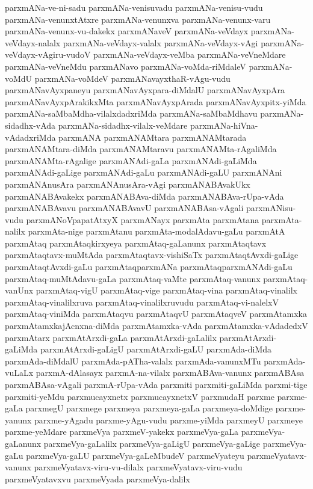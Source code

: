 {parxmANa-ve-ni-sadu
parxmANa-venisuvadu
parxmANa-venisu-vudu
parxmANa-venunxtAtxre
parxmANa-venunxva
parxmANa-venunx-varu
parxmANa-venunx-vu-dakekx
parxmANaveV
parxmANa-veVdayx
parxmANa-veVdayx-nalalx
parxmANa-veVdayx-valalx
parxmANa-veVdayx-vAgi
parxmANa-veVdayx-vAgiru-vudoV
parxmANa-veVdayx-veMba
parxmANa-veVneMdare
parxmANa-veVneMdu
parxmANavo
parxmANa-voMda-riMdaleV
parxmANa-voMdU
parxmANa-voMdeV
parxmANavayxthaR-vAgu-vudu
parxmANavAyxpaneyu
parxmANavAyxpara-diMdalU
parxmANavAyxpAra
parxmANavAyxpArakikxMta
parxmANavAyxpArada
parxmANavAyxpitx-yiMda
parxmANa-saMbaMdha-vilalxdadxriMda
parxmANa-saMbaMdhavu
parxmANa-sidadhx-vAda
parxmANa-sidadhx-vilalx-veMdare
parxmANa-hiVna-vAdadxriMda
parxmANA
parxmANAMtara
parxmANAMtarada
parxmANAMtara-diMda
parxmANAMtaravu
parxmANAMta-rAgaliMda
parxmANAMta-rAgalige
parxmANAdi-gaLa
parxmANAdi-gaLiMda
parxmANAdi-gaLige
parxmANAdi-gaLu
parxmANAdi-gaLU
parxmANAni
parxmANAnusAra
parxmANAnusAra-vAgi
parxmANABAvakUkx
parxmANABAvakekx
parxmANABAva-diMda
parxmANABAva-rUpa-vAda
parxmANABAvavu
parxmANABAvavU
parxmANABAsa-vAgali
parxmANisu-vudu
parxmANoVpapatAtxyX
parxmANayx
parxmAta
parxmAtana
parxmAta-nalilx
parxmAta-nige
parxmAtanu
parxmAta-modalAdavu-gaLu
parxmAtA
parxmAtaq
parxmAtaqkirxyeya
parxmAtaq-gaLanunx
parxmAtaqtavx
parxmAtaqtavx-muMtAda
parxmAtaqtavx-vishiSaTx
parxmAtaqtAvxdi-gaLige
parxmAtaqtAvxdi-gaLu
parxmAtaqparxmANa
parxmAtaqparxmANAdi-gaLu
parxmAtaq-muMtAdavu-gaLa
parxmAtaq-vaMte
parxmAtaq-vanunx
parxmAtaq-vanUnx
parxmAtaq-vigU
parxmAtaq-vige
parxmAtaq-vina
parxmAtaq-vinalilx
parxmAtaq-vinalilxruva
parxmAtaq-vinalilxruvudu
parxmAtaq-vi-nalelxV
parxmAtaq-viniMda
parxmAtaqvu
parxmAtaqvU
parxmAtaqveV
parxmAtamxka
parxmAtamxkajAcnxna-diMda
parxmAtamxka-vAda
parxmAtamxka-vAdadedxV
parxmAtarx
parxmAtArxdi-gaLa
parxmAtArxdi-gaLalilx
parxmAtArxdi-gaLiMda
parxmAtArxdi-gaLigU
parxmAtArxdi-gaLU
parxmAda-diMda
parxmAda-diMdalU
parxmAda-pATha-valalx
parxmAda-vanunxMTu
parxmAda-vuLaLx
parxmA-dAlasayx
parxmA-na-vilalx
parxmABAva-vanunx
parxmABAsa
parxmABAsa-vAgali
parxmA-rUpa-vAda
parxmiti
parxmiti-gaLiMda
parxmi-tige
parxmiti-yeMdu
parxmucayxnetx
parxmucayxnetxV
parxmudaH
parxme
parxme-gaLa
parxmegU
parxmege
parxmeya
parxmeya-gaLa
parxmeya-doMdige
parxme-yanunx
parxme-yAgadu
parxme-yAgu-vudu
parxme-yiMda
parxmeyU
parxmeye
parxme-yeMdare
parxmeVya
parxmeV-yakekx
parxmeVya-gaLa
parxmeVya-gaLanunx
parxmeVya-gaLalilx
parxmeVya-gaLigU
parxmeVya-gaLige
parxmeVya-gaLu
parxmeVya-gaLU
parxmeVya-gaLeMbudeV
parxmeVyateyu
parxmeVyatavx-vanunx
parxmeVyatavx-viru-vu-dilalx
parxmeVyatavx-viru-vudu
parxmeVyatavxvu
parxmeVyada
parxmeVya-dalilx
}
